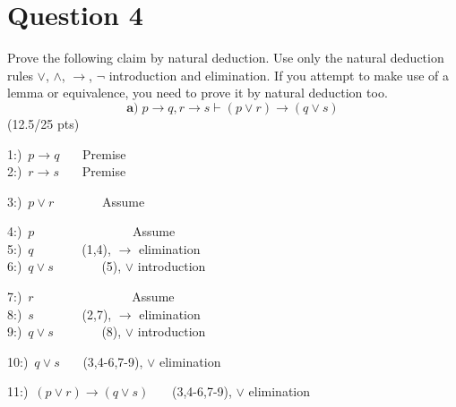 \documentclass[a4paper,12pt]{article}
\newcommand\tab[1][1cm]{\hspace*{#1}}
\begin{document}
\section*{Question 4 \hfill {}}
\tab Prove the following claim by natural deduction. Use only the natural deduction rules $\vee$, $\wedge$, $\rightarrow$, $\neg$ introduction and elimination. If you attempt to make use of a lemma or equivalence, you need to prove it by natural deduction too.
\begin{equation*}
    \textbf{a)} \; p \rightarrow q, r \rightarrow s \vdash (p \vee r) \rightarrow (q \vee s)
\end{equation*}
\hfill \small{(12.5/25 pts)}\\
\begin{tcolorbox}

\begin{center}
1:)\, $p \rightarrow q $\,\,\,\,\,\,\,\,\, Premise \\
2:)\, $r \rightarrow s $\,\,\,\,\,\,\,\,\, Premise  \\
\begin{tcolorbox}
\begin{center}
    3:)\, $p \vee r $\,\,\,\,\,\,\,\,\,\,\,\,\,\,\,\,\,\,\,\,\, Assume \\
    \begin{tcolorbox}
    \begin{center}
        4:)\, $p  $\,\,\,\,\,\,\,\,\,\,\,\,\,\,\,\,\,\,\,\,\,\,\,\,\,\,\,\,\,\,\,\,\,\,\,\,\,\,\,\,\,\,\,\,\, Assume \\
        5:)\, $q  $\,\,\,\,\,\,\,\,\,\,\,\,\,\,\,\,\,\,\,\,\, (1,4), $\rightarrow $ elimination \\
        6:)\, $q \vee s$\,\,\,\,\,\,\,\,\,\,\,\,\,\,\,\,\,\,\,\,\, (5), $\vee $ introduction \\
    \end{center}
    \end{tcolorbox}
    \begin{tcolorbox}
    \begin{center}
        7:)\, $r  $\,\,\,\,\,\,\,\,\,\,\,\,\,\,\,\,\,\,\,\,\,\,\,\,\,\,\,\,\,\,\,\,\,\,\,\,\,\,\,\,\,\,\,\,\, Assume \\
        8:)\, $s  $\,\,\,\,\,\,\,\,\,\,\,\,\,\,\,\,\,\,\,\,\, (2,7), $\rightarrow $ elimination \\
        9:)\, $q \vee s$\,\,\,\,\,\,\,\,\,\,\,\,\,\,\,\,\,\,\,\,\, (8), $\vee $ introduction \\
    \end{center}
    \end{tcolorbox}
    10:)\, $q \vee s$\,\,\,\,\,\,\,\,\, (3,4-6,7-9), $\vee $ elimination \\
\end{center}
\end{tcolorbox}
11:)\, $(p \vee r )\rightarrow(q \vee s)$\,\,\,\,\,\,\,\,\, (3,4-6,7-9), $\vee $ elimination \\
\end{center}

\end{tcolorbox}
\end{document}

